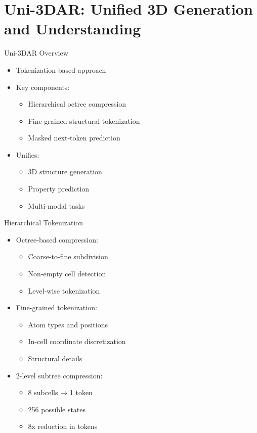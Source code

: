 \section{Uni-3DAR: Unified 3D Generation and Understanding}

\begin{frame}{Uni-3DAR Overview}
    \begin{itemize}
        \item Tokenization-based approach
        \item Key components:
        \begin{itemize}
            \item Hierarchical octree compression
            \item Fine-grained structural tokenization
            \item Masked next-token prediction
        \end{itemize}
        \item Unifies:
        \begin{itemize}
            \item 3D structure generation
            \item Property prediction
            \item Multi-modal tasks
        \end{itemize}
    \end{itemize}
\end{frame}

\begin{frame}{Hierarchical Tokenization}
    \begin{itemize}
        \item Octree-based compression:
        \begin{itemize}
            \item Coarse-to-fine subdivision
            \item Non-empty cell detection
            \item Level-wise tokenization
        \end{itemize}
        \item Fine-grained tokenization:
        \begin{itemize}
            \item Atom types and positions
            \item In-cell coordinate discretization
            \item Structural details
        \end{itemize}
        \item 2-level subtree compression:
        \begin{itemize}
            \item 8 subcells → 1 token
            \item 256 possible states
            \item 8x reduction in tokens
        \end{itemize}
    \end{itemize}
\end{frame}

